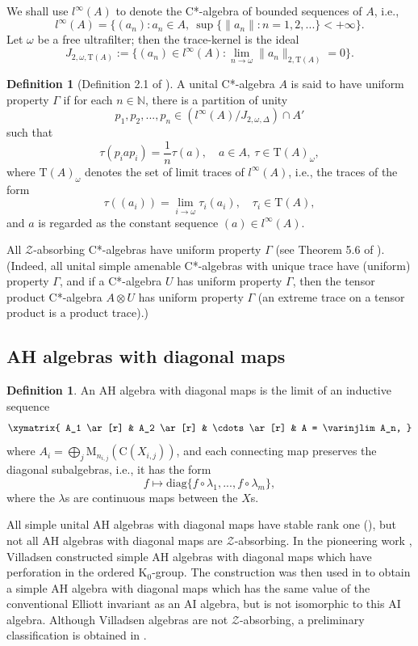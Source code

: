 \documentclass[12pt, oneside, psamsfonts]{amsart}
\theoremstyle{definition}
\newtheorem{defn}[thm]{Definition}
\theoremstyle{remark}
\numberwithin{equation}{section}
\newcommand{\norm}[1]{\| #1\|}
\newcommand{\Kzero}{\textrm{K}_0}
\newcommand{\tr}{\mathrm{T}}
\begin{document}
We shall use $l^\infty(A)$ to denote the C*-algebra of bounded sequences of $A$, i.e., $$l^\infty(A) = \{(a_n): a_n \in A,\ \sup\{\norm{a_n}: n=1, 2, ...\} < +\infty \}.$$
Let $\omega$ be a free ultrafilter; then the trace-kernel is the ideal
$$J_{2, \omega, \tr(A)}:=\{(a_n) \in l^\infty(A): \lim_{n \to\omega} \norm{a_n}_{2, \tr(A)} = 0\}.$$

\begin{defn}[Definition 2.1 of \cite{CETW-Gamma}]\label{UGamma-defn}
A unital C*-algebra $A$ is said to have uniform property $\Gamma$ if for each $n\in \mathbb N$, there is a partition of unity $$p_1, p_2, ..., p_n \in (l^\infty(A)/J_{2, \omega, \Delta}) \cap A'$$ such that
$$\tau(p_iap_i) = \frac{1}{n}\tau(a),\quad a\in A,\ \tau\in \tr(A)_\omega,$$
where $\tr(A)_\omega$ denotes the set of limit traces of $l^\infty(A)$, i.e., the traces of the form $$\tau((a_i)) = \lim_{i \to \omega} \tau_i(a_i),\quad \tau_i \in \tr(A),$$
and $a$ is regarded as the constant sequence $(a) \in l^\infty(A)$. 

 
All $\mathcal Z$-absorbing C*-algebras have uniform property $\Gamma$ (see Theorem 5.6 of \cite{CETW-Gamma}). (Indeed, all unital simple  amenable C*-algebras with unique trace have (uniform) property $\Gamma$, and if a C*-algebra $U$ has uniform property $\Gamma$, then the tensor product C*-algebra $A \otimes U$ has uniform property $\Gamma$ (an extreme trace on a tensor product is a product trace).)
\end{defn}



\subsection{AH algebras with diagonal maps}

\begin{defn}
An AH algebra with diagonal maps is the limit of an inductive sequence
$$\xymatrix{
A_1 \ar[r] & A_2 \ar[r] & \cdots \ar[r] & A = \varinjlim A_n,
}$$
where $A_i = \bigoplus_{j} \mathrm{M}_{n_{i, j}}(\mathrm{C}(X_{i, j}))$, and each connecting map preserves the diagonal subalgebras, i.e., it has the form $$f \mapsto \mathrm{diag}\{f\circ\lambda_1, ..., f\circ\lambda_m\},$$ where the $\lambda$s are continuous maps between the $X$s.
\end{defn}

All simple unital AH algebras with diagonal maps have stable rank one (\cite{EHT-sr1}), but not all AH algebras with diagonal maps are $\mathcal Z$-absorbing. In the pioneering work \cite{Vill-perf},  Villadsen constructed simple AH algebras with diagonal maps which have perforation in the ordered $\Kzero$-group. The construction was then used in \cite{Toms-Ann} to obtain a simple AH algebra with diagonal maps which has  the same value of the conventional Elliott invariant as an AI algebra, but is not isomorphic to this AI algebra. Although Villadsen algebras are not $\mathcal Z$-absorbing, a preliminary classification is obtained in \cite{ELN-Vill}.
\end{document}
